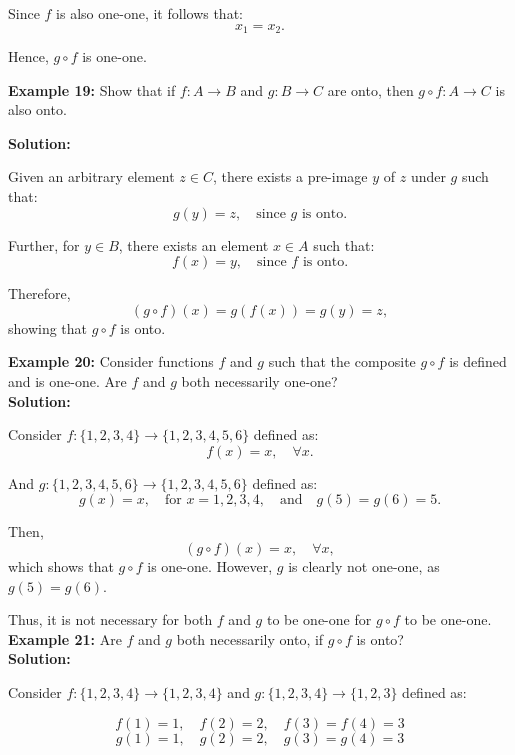 \documentclass[12pt]{article}
\begin{document}
Since \( f \) is also one-one, it follows that:
\[
x_1 = x_2.
\]

Hence, \( g \circ f \) is one-one.\newline

\textbf{Example 19:}  
Show that if \( f: A \to B \) and \( g: B \to C \) are onto, then \( g \circ f: A \to C \) is also onto.\newline

\textbf{Solution:}  

Given an arbitrary element \( z \in C \), there exists a pre-image \( y \) of \( z \) under \( g \) such that:
\[
g(y) = z, \quad \text{since } g \text{ is onto.}
\]

Further, for \( y \in B \), there exists an element \( x \in A \) such that:
\[
f(x) = y, \quad \text{since } f \text{ is onto.}
\]

Therefore, 
\[
(g \circ f)(x) = g(f(x)) = g(y) = z,
\]
showing that \( g \circ f \) is onto.\newline

\textbf{Example 20:}  
Consider functions \( f \) and \( g \) such that the composite \( g \circ f \) is defined and is one-one. Are \( f \) and \( g \) both necessarily one-one?\\

\textbf{Solution:}  

Consider \( f: \{1, 2, 3, 4\} \to \{1, 2, 3, 4, 5, 6\} \) defined as:
\[
f(x) = x, \quad \forall x.
\]

And \( g: \{1, 2, 3, 4, 5, 6\} \to \{1, 2, 3, 4, 5, 6\} \) defined as:
\[
g(x) = x, \quad \text{for } x = 1, 2, 3, 4, \quad \text{and} \quad g(5) = g(6) = 5.
\]

Then, 
\[
(g \circ f)(x) = x, \quad \forall x,
\]
which shows that \( g \circ f \) is one-one. However, \( g \) is clearly not one-one, as \( g(5) = g(6) \). 

Thus, it is not necessary for both \( f \) and \( g \) to be one-one for \( g \circ f \) to be one-one.\\

\textbf{Example 21:}  
Are \( f \) and \( g \) both necessarily onto, if \( g \circ f \) is onto?\\

\textbf{Solution:}  

Consider \( f: \{1, 2, 3, 4\} \to \{1, 2, 3, 4\} \) and  
\( g: \{1, 2, 3, 4\} \to \{1, 2, 3\} \) defined as:  

\[
f(1) = 1, \quad f(2) = 2, \quad f(3) = f(4) = 3
\]
\[
g(1) = 1, \quad g(2) = 2, \quad g(3) = g(4) = 3
\]
\end{document}
